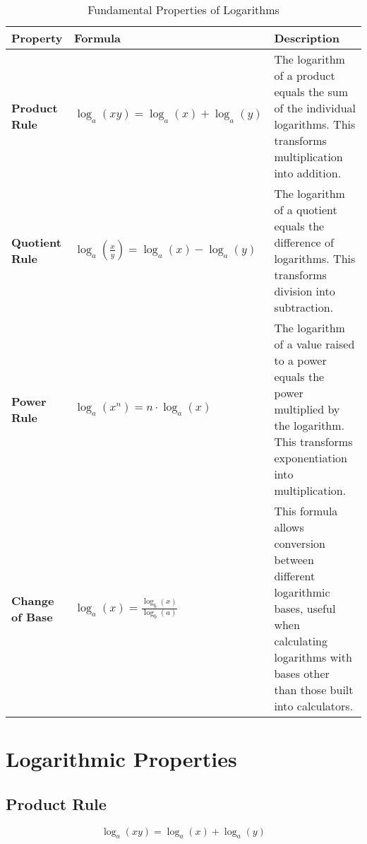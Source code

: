 \documentclass{article}
\begin{document}
\begin{table}[htbp]
  \centering
  \renewcommand{\arraystretch}{1.5} %
  \setlength{\tabcolsep}{15pt} %
  \begin{tabular}{|l|p{5cm}|p{6cm}|}
    \hline
    \textbf{Property} & \textbf{Formula} & \textbf{Description} \\
    \hline
    \textbf{Product Rule} &
                            $\log_a(xy) = \log_a(x) + \log_a(y)$ &
                                                                   The logarithm of a product equals the sum of the individual logarithms. This transforms multiplication into addition. \\
    \hline
    \textbf{Quotient Rule} &
                             $\log_a\left(\frac{x}{y}\right) = \log_a(x) - \log_a(y)$ &
                                                                                        The logarithm of a quotient equals the difference of logarithms. This transforms division into subtraction. \\
    \hline
    \textbf{Power Rule} &
                          $\log_a(x^n) = n \cdot \log_a(x)$ &
                                                              The logarithm of a value raised to a power equals the power multiplied by the logarithm. This transforms exponentiation into multiplication. \\
    \hline
    \textbf{Change of Base} &
                              $\log_a(x) = \frac{\log_b(x)}{\log_b(a)}$ &
                                                                          This formula allows conversion between different logarithmic bases, useful when calculating logarithms with bases other than those built into calculators. \\
    \hline
  \end{tabular}
  \caption{Fundamental Properties of Logarithms}
  \label{tab:log_properties}
\end{table}

\section*{Logarithmic Properties}

\subsection*{Product Rule}
\begin{equation}
  \log_a(xy) = \log_a(x) + \log_a(y)
\end{equation}
\end{document}
